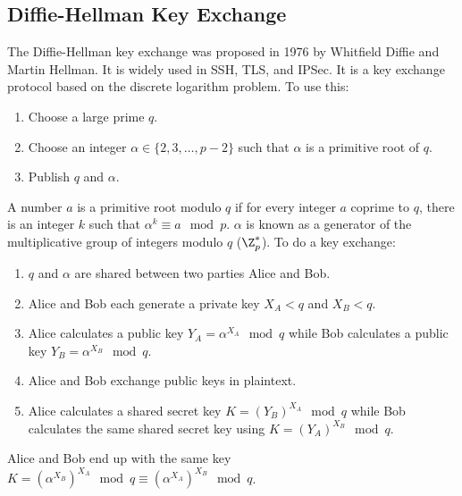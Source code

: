 \documentclass{math}
\begin{document}
\subsection*{Diffie-Hellman Key Exchange}
The Diffie-Hellman key exchange was proposed in 1976 by Whitfield Diffie and
Martin Hellman. It is widely used in SSH, TLS, and IPSec. It is a key
exchange protocol based on the discrete logarithm problem. To use this:
\begin{enumerate}
  \item Choose a large prime \( q \).
  \item Choose an integer \( \alpha\in\{2,3,\dots,p-2\} \) such that
  \( \alpha \) is a primitive root of \( q \).
  \item Publish \( q \) and \( \alpha \).
\end{enumerate}
A number \( a \) is a primitive root modulo \( q \) if for every integer \( a \)
coprime to \( q \), there is an integer \( k \) such that \( \alpha^k\equiv
a\mod p \). \( \alpha \) is known as a generator of the multiplicative group of
integers modulo \( q \) (\( \Z_{p}^{*} \)). To do a key exchange:
\begin{enumerate}
  \item \( q \) and \( \alpha \) are shared between two parties Alice and Bob.
  \item Alice and Bob each generate a private key \( X_A < q \) and
  \( X_B < q \).
  \item Alice calculates a public key \( Y_A = \alpha^{X_A}\mod q \) while Bob
  calculates a public key \( Y_B = \alpha^{X_B}\mod q \).
  \item Alice and Bob exchange public keys in plaintext.
  \item Alice calculates a shared secret key \( K = (Y_B)^{X_A}\mod q \) while
  Bob calculates the same shared secret key using \( K = (Y_A)^{X_B}\mod q \).
\end{enumerate}
Alice and Bob end up with the same key \( K = (\alpha^{X_B})^{X_A}\mod q \equiv
(\alpha^{X_A})^{X_B}\mod q \).
\end{document}
